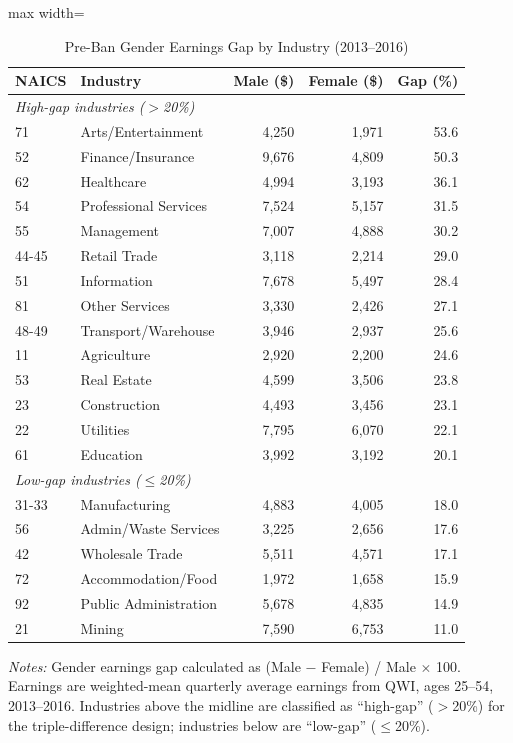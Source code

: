 \begin{table}[H]
\centering
\caption{Pre-Ban Gender Earnings Gap by Industry (2013--2016)}
\label{tab:pregap}
\begin{threeparttable}
\begin{adjustbox}{max width=\textwidth}
\begin{tabular}{llrrr}
\toprule
NAICS & Industry & Male (\$) & Female (\$) & Gap (\%) \\
\midrule
\multicolumn{5}{l}{\emph{High-gap industries ($>$20\%)}} \\
71 & Arts/Entertainment & 4,250 & 1,971 & 53.6 \\
52 & Finance/Insurance & 9,676 & 4,809 & 50.3 \\
62 & Healthcare & 4,994 & 3,193 & 36.1 \\
54 & Professional Services & 7,524 & 5,157 & 31.5 \\
55 & Management & 7,007 & 4,888 & 30.2 \\
44-45 & Retail Trade & 3,118 & 2,214 & 29.0 \\
51 & Information & 7,678 & 5,497 & 28.4 \\
81 & Other Services & 3,330 & 2,426 & 27.1 \\
48-49 & Transport/Warehouse & 3,946 & 2,937 & 25.6 \\
11 & Agriculture & 2,920 & 2,200 & 24.6 \\
53 & Real Estate & 4,599 & 3,506 & 23.8 \\
23 & Construction & 4,493 & 3,456 & 23.1 \\
22 & Utilities & 7,795 & 6,070 & 22.1 \\
61 & Education & 3,992 & 3,192 & 20.1 \\
\midrule
\multicolumn{5}{l}{\emph{Low-gap industries ($\leq$20\%)}} \\
31-33 & Manufacturing & 4,883 & 4,005 & 18.0 \\
56 & Admin/Waste Services & 3,225 & 2,656 & 17.6 \\
42 & Wholesale Trade & 5,511 & 4,571 & 17.1 \\
72 & Accommodation/Food & 1,972 & 1,658 & 15.9 \\
92 & Public Administration & 5,678 & 4,835 & 14.9 \\
21 & Mining & 7,590 & 6,753 & 11.0 \\
\bottomrule
\end{tabular}
\end{adjustbox}
\begin{tablenotes}[flushleft]
\small
\item \emph{Notes:} Gender earnings gap calculated as (Male $-$ Female) / Male $\times$ 100. Earnings are weighted-mean quarterly average earnings from QWI, ages 25--54, 2013--2016. Industries above the midline are classified as ``high-gap'' ($>$20\%) for the triple-difference design; industries below are ``low-gap'' ($\leq$20\%).
\end{tablenotes}
\end{threeparttable}
\end{table}
